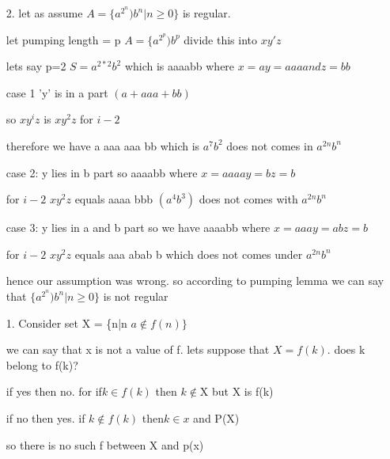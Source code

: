 \documentclass[11pt]{article}
\theoremstyle{thmstyle}
\begin{document}

\thispagestyle{firstpage} %

\setlength{\abovedisplayskip}{20pt} %
\setlength{\belowdisplayskip}{20pt} %





\begin{itemize}\setlength{\itemsep}{1em} %



\item[2.] let as assume $A = \{ a^2^n)b^n | n \geq 0\} $ is regular. 

let pumping length = p $A = \{ a^2^p)b^p$ divide this into $xy'z$

lets say p=2
$S= a^{2*2} b^2$ which is aaaabb where $x=a y=aaa and z=bb$

case 1 'y' is in a part $(a + aaa + bb)$

so $xy^iz $ is  $xy^2z $ for $i - 2$

therefore we have a aaa aaa bb which is $a^7 b^2$ does not comes in $a^{2n}b^n$

case 2: y lies in b part so aaaabb where $x=aaaa y=b z=b$

for $i-2$ $xy^2z$ equals aaaa bbb $(a^4b^3)$ does not comes with $a^{2n}b^n$

case 3: y lies in a and b part so we have aaaabb where $x=aaa y=ab z=b$

for $i-2$ $xy^2z$ equals aaa abab b which does not comes under $a^{2n}b^n$

hence our assumption was wrong. so according to pumping lemma we can say that 
$\{ a^2^n)b^n | n \geq 0\}$ is not regular 



\item[1.] Consider  set X = \{n|n $a\not\in f(n)\}$

 we can say  that x is not a value of f. lets suppose that $X = f(k).$ does k belong to f(k)?
 
 if yes then no. for if$ k \in f(k)$ then $k \not\in $X but X is f(k)
 
 if no then yes. if $k \not\in f(k)$ then$ k \in x$ and P(X)
 
 so there is no such f between X and p(x)
 
 
\end{itemize}
\end{document}
